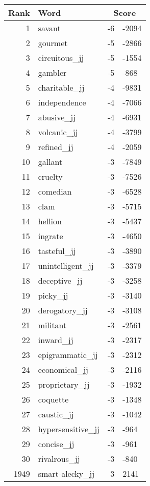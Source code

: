 \begin{longtable}[!htbp]{| rlr@{.}l |}
    \hline
    \textbf{Rank} & \textbf{Word} & \multicolumn{2}{c|}{\textbf{Score}} \\
    \hline
    \endhead
    1 & savant & -6 & -2094 \\
    2 & gourmet & -5 & -2866 \\
    3 & circuitous\_jj & -5 & -1554 \\
    4 & gambler & -5 & -868 \\
    5 & charitable\_jj & -4 & -9831 \\
    6 & independence & -4 & -7066 \\
    7 & abusive\_jj & -4 & -6931 \\
    8 & volcanic\_jj & -4 & -3799 \\
    9 & refined\_jj & -4 & -2059 \\
    10 & gallant & -3 & -7849 \\
    11 & cruelty & -3 & -7526 \\
    12 & comedian & -3 & -6528 \\
    13 & clam & -3 & -5715 \\
    14 & hellion & -3 & -5437 \\
    15 & ingrate & -3 & -4650 \\
    16 & tasteful\_jj & -3 & -3890 \\
    17 & unintelligent\_jj & -3 & -3379 \\
    18 & deceptive\_jj & -3 & -3258 \\
    19 & picky\_jj & -3 & -3140 \\
    20 & derogatory\_jj & -3 & -3108 \\
    21 & militant & -3 & -2561 \\
    22 & inward\_jj & -3 & -2317 \\
    23 & epigrammatic\_jj & -3 & -2312 \\
    24 & economical\_jj & -3 & -2116 \\
    25 & proprietary\_jj & -3 & -1932 \\
    26 & coquette & -3 & -1348 \\
    27 & caustic\_jj & -3 & -1042 \\
    28 & hypersensitive\_jj & -3 & -964 \\
    29 & concise\_jj & -3 & -961 \\
    30 & rivalrous\_jj & -3 & -840 \\
    1949 & smart-alecky\_jj & 3 & 2141 \\

\end{longtable}
